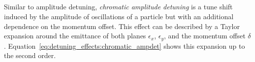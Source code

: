 \subsection{}

Similar to amplitude detuning, \textit{chromatic amplitude detuning} is a tune shift induced by the
amplitude of oscillations of a particle but with an additional dependence on the momentum offset.
This effect can be described by a Taylor expansion around the emittance of both planes $\epsilon_x$,
$\epsilon_y$, and the momentum offset $\delta$.
Equation~\eqref{eq:detuning_effects:chromatic_ampdet} shows this expansion up to the second order. 

